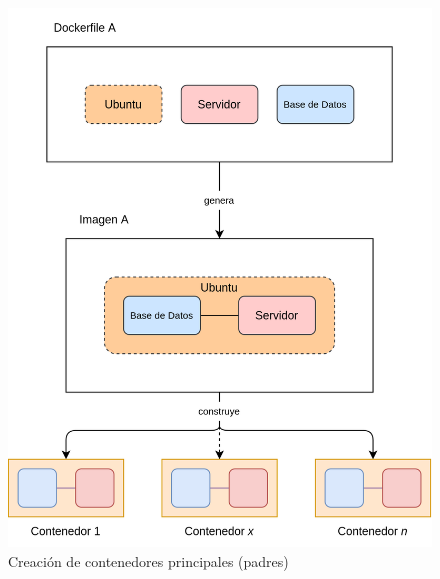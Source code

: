                 \begin{figure}[!htbp]
                    \centering

                    \includegraphics[scale=0.14]{images/Diagramas/Contenedor A.png}

                    \caption{Creación de contenedores principales (padres)}
                    \label{fig:contenedor-padre}
                \end{figure}
                
